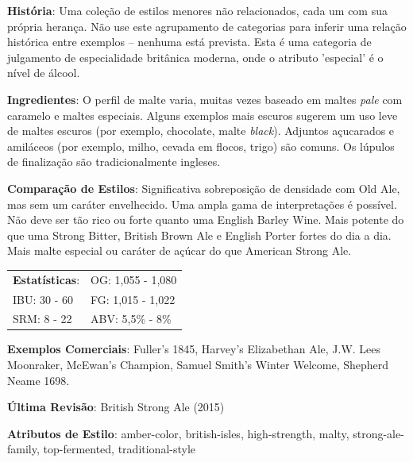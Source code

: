 \textbf{História}: Uma coleção de estilos menores não relacionados, cada um com sua própria herança. Não use este agrupamento de categorias para inferir uma relação histórica entre exemplos – nenhuma está prevista. Esta é uma categoria de julgamento de especialidade britânica moderna, onde o atributo 'especial' é o nível de álcool.

\textbf{Ingredientes}: O perfil de malte varia, muitas vezes baseado em maltes \textit{pale} com caramelo e maltes especiais. Alguns exemplos mais escuros sugerem um uso leve de maltes escuros (por exemplo, chocolate, malte \textit{black}). Adjuntos açucarados e amiláceos (por exemplo, milho, cevada em flocos, trigo) são comuns. Os lúpulos de finalização são tradicionalmente ingleses.

\textbf{Comparação de Estilos}: Significativa sobreposição de densidade com Old Ale, mas sem um caráter envelhecido. Uma ampla gama de interpretações é possível. Não deve ser tão rico ou forte quanto uma English Barley Wine. Mais potente do que uma Strong Bitter, British Brown Ale e English Porter fortes do dia a dia. Mais malte especial ou caráter de açúcar do que American Strong Ale.

\begin{tabular}{@{}p{35mm}p{35mm}@{}}
  \textbf{Estatísticas}: & OG: 1,055 - 1,080 \\
  IBU: 30 - 60  & FG: 1,015 - 1,022  \\
  SRM: 8 - 22  & ABV: 5,5\% - 8\%
\end{tabular}

\textbf{Exemplos Comerciais}: Fuller’s 1845, Harvey’s Elizabethan Ale, J.W. Lees Moonraker, McEwan’s Champion, Samuel Smith’s Winter Welcome, Shepherd Neame 1698.

\textbf{Última Revisão}: British Strong Ale (2015)

\textbf{Atributos de Estilo}: amber-color, british-isles, high-strength, malty, strong-ale-family, top-fermented, traditional-style
